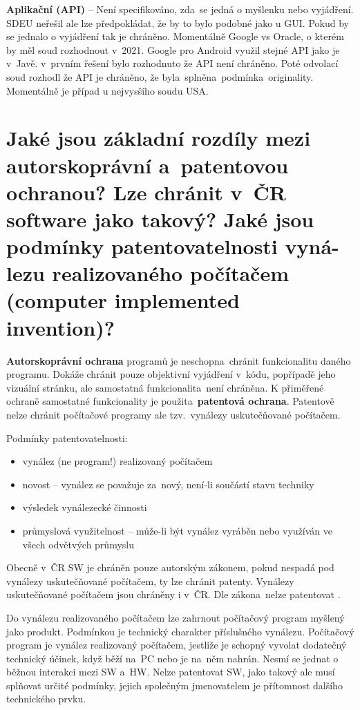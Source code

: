 \textbf{Aplikační (API)} -- Není specifikováno, zda~se jedná o myšlenku nebo vyjádření. SDEU neřešil ale lze předpokládat, že by to bylo podobné jako u GUI\@. Pokud by se jednalo o vyjádření tak je chráněno. Momentálně Google vs Oracle, o kterém by měl soud rozhodnout v~2021. Google pro Android využil stejné API jako je v~Javě. v~prvním řešení bylo rozhodnuto že API není chráněno. Poté odvolací soud rozhodl že API je chráněno, že byla~splněna~podmínka~originality. Momentálně je případ u nejvysšího soudu USA\@.


\section{Jaké jsou základní rozdíly mezi autorskoprávní a~patentovou ochranou? Lze chránit v~ČR software jako takový? Jaké jsou podmínky patentovatelnosti vyná-lezu realizovaného počítačem (computer implemented invention)?}

\textbf{Autorskoprávní ochrana} programů je neschopna~chránit funkcionalitu daného programu. Dokáže chránit pouze objektivní vyjádření v~kódu, popřípadě jeho vizuální stránku, ale samostatná funkcionalita~není chráněna. K přiměřené ochraně samostatné funkcionality je použita~\textbf{patentová ochrana}. Patentově nelze chránit počítačové programy ale tzv.\ vynálezy uskutečňované počítačem.
\newline

\noindent Podmínky patentovatelnosti:
\begin{itemize}[noitemsep]
    \item vynález (ne program!) realizovaný počítačem
    \item novost -- vynález se považuje za~nový, není-li součástí stavu techniky
    \item výsledek vynálezecké činnosti
    \item průmyslová využitelnost -- může-li být vynález vyráběn nebo využíván ve všech odvětvých průmyslu
\end{itemize}
Obecně v~ČR SW je chráněn pouze autorským zákonem, pokud nespadá pod vynálezy uskutečňované počítačem, ty lze chránit patenty.  
Vynálezy uskutečňované počítačem jsou chráněny i v~ČR. Dle zákona~nelze patentovat .

Do vynálezu realizovaného počítačem lze zahrnout počítačový program myšlený jako produkt. Podmínkou je technický charakter příslušného vynálezu. Počítačový program je vynález realizovaný počítačem, jestliže je schopný vyvolat dodatečný technický účinek, když běží na~PC nebo je na~něm nahrán. Nesmí se jednat o běžnou interakci mezi SW a~HW\@. Nelze patentovat SW, jako takový ale musí splňovat určité podmínky, jejich společným jmenovatelem je přítomnost dalšího technického prvku. 


